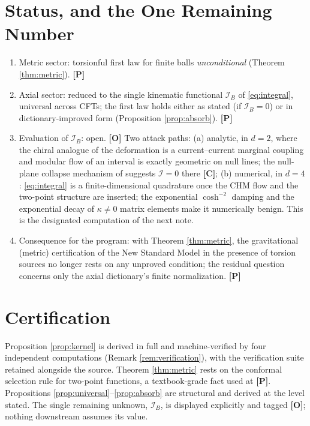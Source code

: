 \documentclass[11pt]{article}
\theoremstyle{definition}
\newcommand{\pP}{\textbf{[P]}}
\newcommand{\pC}{\textbf{[C]}}
\newcommand{\pO}{\textbf{[O]}}
\begin{document}
\section{Status, and the One Remaining Number}

\begin{enumerate}[itemsep=2pt]
\item Metric sector: torsionful first law for finite balls
\emph{unconditional} (Theorem \ref{thm:metric}). \pP{}
\item Axial sector: reduced to the single kinematic functional
$\mathcal I_B$ of \eqref{eq:integral}, universal across CFTs; the first
law holds either as stated (if $\mathcal I_B=0$) or in
dictionary-improved form (Proposition \ref{prop:absorb}). \pP{}
\item Evaluation of $\mathcal I_B$: open. \pO{} Two attack paths:
(a) analytic, in $d=2$, where the chiral analogue of the deformation is a
current--current marginal coupling and modular flow of an interval is
exactly geometric on null lines; the null-plane collapse mechanism of
\cite{CasiniTesteTorroba2017} suggests $\mathcal I=0$ there \pC{};
(b) numerical, in $d=4$: \eqref{eq:integral} is a finite-dimensional
quadrature once the CHM flow and the two-point structure are inserted;
the exponential $\cosh^{-2}$ damping and the exponential decay of
$\kappa\neq0$ matrix elements make it numerically benign. This is the
designated computation of the next note.
\item Consequence for the program: with Theorem \ref{thm:metric}, the
gravitational (metric) certification of the New Standard Model
\cite{McGwier2026c} in the presence of torsion sources no longer rests on
any unproved condition; the residual question concerns only the axial
dictionary's finite normalization. \pP{}
\end{enumerate}

\section*{Certification}
Proposition \ref{prop:kernel} is derived in full and machine-verified by
four independent computations (Remark \ref{rem:verification}), with the
verification suite retained alongside the source. Theorem
\ref{thm:metric} rests on the conformal selection rule for two-point
functions, a textbook-grade fact used at \pP{}. Propositions
\ref{prop:universal}--\ref{prop:absorb} are structural and derived at the
level stated. The single remaining unknown, $\mathcal I_B$, is displayed
explicitly and tagged \pO{}; nothing downstream assumes its value.
\end{document}
